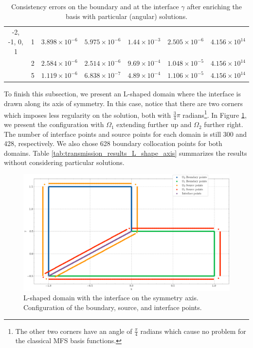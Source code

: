 \begin{table}[!htbp]
\begin{longtable}{ccccccc}
        -2, -1, 0, 1 & 1 & $3.898\times10^{-6}$ & $5.975\times10^{-6}$ & $1.44\times10^{-3}$ & $2.505\times10^{-6}$ & $4.156\times10^{14}$ \\
        & 2 & $2.584\times10^{-6}$ & $2.514\times10^{-6}$ & $9.69\times10^{-4}$ & $1.048\times10^{-5}$ & $4.156\times10^{14}$ \\
        & 5 & $1.119\times10^{-6}$ & $6.838\times10^{-7}$ & $4.89\times10^{-4}$ & $1.106\times10^{-5}$ & $4.156\times10^{14}$ \\
        \midrule[\heavyrulewidth] %
    \end{longtable}
    \caption{Consistency errors on the boundary and at the interface \(\gamma\) after enriching the basis with particular (angular) solutions.}
    \label{tab:transmission_results_L_shape_rectangles_particular}
\end{table}

To finish this subsection, we present an L-shaped domain where the interface is drawn along its axis of symmetry. In this case, notice that there are two corners which imposes less regularity on the solution, both with \(\frac{3}{4}\pi\) radians\footnote{The other two corners have an angle of \(\frac{\pi}{4}\) radians which cause no problem for the classical \ac{MFS} basis functions.}. In Figure \ref{transmission_L_shape_col_axis_config}, we present the configuration with \(\Omega_1\) extending further up and \(\Omega_2\) further right. The number of interface points and source points for each domain is still 300 and 428, respectively. We also chose 628 boundary collocation points for both domains. Table \ref{tab:transmission_results_L_shape_axis} summarizes the results without considering particular solutions.

\begin{figure}[!htb]
    \centering
    \includegraphics[height=0.38\linewidth,width=0.5\linewidth]{Images/Transmission/L_shape_2_axis_col_points.png}
    \caption{L-shaped domain with the interface on the symmetry axis. Configuration of the boundary, source, and interface points.}
    \label{transmission_L_shape_col_axis_config}
\end{figure}

